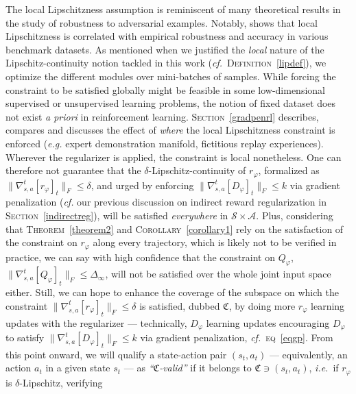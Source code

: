 The local Lipschitzness assumption is reminiscent of many theoretical results
in the study of robustness to adversarial examples.
Notably, \cite{Yang2020-bz} shows that local Lipschitzness is correlated with
empirical robustness and accuracy in various benchmark datasets.
As mentioned when we justified the \emph{local} nature of the Lipschitz-continuity notion tackled in this work
(\textit{cf.}~\textsc{Definition}~\ref{lipdef}),
we optimize the different modules over mini-batches of samples.
While forcing the constraint to be satisfied globally might be feasible in some
low-dimensional supervised or unsupervised learning problems,
the notion of fixed dataset does not exist \textit{a priori} in reinforcement learning.
\textsc{Section}~\ref{gradpenrl} describes, compares and discusses
the effect of \emph{where} the local Lipschitzness constraint is enforced
(\textit{e.g.} expert demonstration manifold, fictitious replay experiences).
Wherever the regularizer is applied,
the constraint is local nonetheless.
One can therefore not guarantee that the $\delta$-Lipschitz-continuity of $r_\varphi$,
formalized as $\lVert \nabla_{s,a}^t[r_\varphi]_t \rVert _F \leq \delta$,
and urged by enforcing
$\lVert \nabla_{s,a}^t[D_\varphi]_t \rVert _F \leq k$ via gradient penalization
(\textit{cf.} our previous discussion on indirect reward regularization in \textsc{Section}~\ref{indirectreg}),
will be satisfied \emph{everywhere}
in $\mathcal{S} \times \mathcal{A}$.
Plus, considering that \textsc{Theorem}~\ref{theorem2} and \textsc{Corollary}~\ref{corollary1}
rely on the satisfaction of the constraint on $r_\varphi$ along every trajectory,
which is likely not to be verified in practice,
we can say with high confidence that the constraint on $Q_\varphi$,
$\lVert \nabla_{s,a}^t[Q_\varphi]_t \rVert _F \leq \Delta_\infty$,
will not be satisfied over the whole joint input space either.
Still, we can hope to enhance the coverage of the subspace on which the constraint
$\lVert \nabla_{s,a}^t[r_\varphi]_t \rVert _F \leq \delta$ is satisfied,
dubbed $\mathfrak{C}$, by doing more $r_\varphi$ learning updates with the regularizer
--- technically, $D_\varphi$ learning updates encouraging $D_\varphi$ to satisfy
$\lVert \nabla_{s,a}^t[D_\varphi]_t \rVert _F \leq k$ via gradient penalization,
\textit{cf.}~\textsc{eq}~\ref{eqgp}.
From this point onward,
we will qualify a state-action pair $(s_t, a_t)$
--- equivalently, an action $a_t$ in a given state $s_t$ ---
as \textit{``$\mathfrak{C}$-valid''} if it belongs to $\mathfrak{C} \ni (s_t, a_t)$,
\textit{i.e.}~if $r_\varphi$ is $\delta$-Lipschitz, verifying
